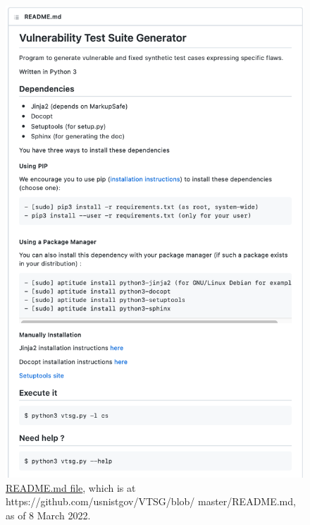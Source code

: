 \begin{appendices}
\begin{figure}[tbp]
  \includegraphics[width=0.8\linewidth]{fig_README_md.png}
  \caption{\href{https://github.com/usnistgov/VTSG/blob/master/README.md}
    {README.md file}, which is at
    https://github.com/usnistgov/VTSG/blob/ master/README.md,
    as of 8 March 2022.}
  \label{fig:README.md file}
\end{figure}



\end{appendices}
